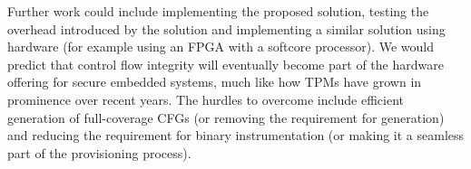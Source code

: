 Further work could include implementing the proposed solution, testing the overhead introduced by the solution and implementing a similar solution using hardware (for example using an FPGA with a softcore processor). We would predict that control flow integrity will eventually become part of the hardware offering for secure embedded systems, much like how TPMs have grown in prominence over recent years. The hurdles to overcome include efficient generation of full-coverage CFGs (or removing the requirement for generation) and reducing the requirement for binary instrumentation (or making it a seamless part of the provisioning process).

